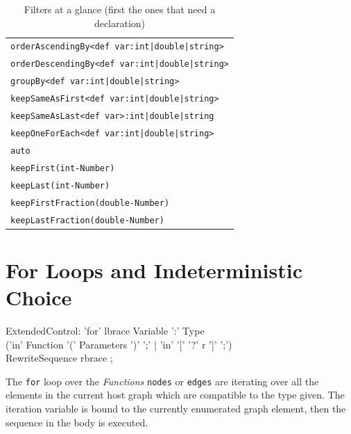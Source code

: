 \begin{table}[htbp]
\centering
\begin{tabular}{|l|}
\hline
\texttt{orderAscendingBy<def var:int|double|string>}\\
\texttt{orderDescendingBy<def var:int|double|string>}\\
\texttt{groupBy<def var:int|double|string>}\\
\texttt{keepSameAsFirst<def var:int|double|string>}\\
\texttt{keepSameAsLast<def var>:int|double|string}\\
\texttt{keepOneForEach<def var:int|double|string>}\\
\texttt{auto}\\
\hline
\texttt{keepFirst(int-Number)}\\
\texttt{keepLast(int-Number)}\\
\texttt{keepFirstFraction(double-Number)}\\
\texttt{keepLastFraction(double-Number)}\\
\hline
\end{tabular}
\caption{Filters at a glance (first the ones that need a declaration)}
\label{filterstab}
\end{table}


\section{For Loops and Indeterministic Choice}

\begin{rail}
  ExtendedControl:
    'for' lbrace Variable ':' Type\\
    ('in' Function '(' Parameters ')' ';' |
    'in' '[' '?' r ']' ';')\\
    RewriteSequence rbrace
    ;
\end{rail}\label{forgraphelem}\label{forincidentadjacent}\label{formatch}

The \texttt{for} loop over the \emph{Functions} \texttt{nodes} or \texttt{edges} are iterating over all the elements in the current host graph which are compatible to the type given.
The iteration variable is bound to the currently enumerated graph element, then the sequence in the body is executed.

